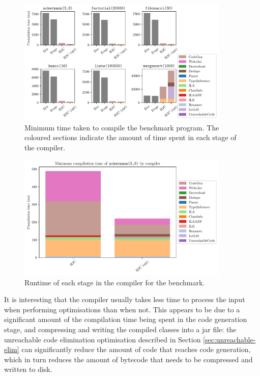 \documentclass[dissertation.tex]{subfiles}
\begin{document}
{{        \begin{figure}[h]
            \centering
            \captionsetup{width=0.8\textwidth}
            \includegraphics[width=0.9\textwidth]{graphs/compiler_perf.pdf}
            \caption{Minimum time taken to compile the benchmark program. The coloured sections indicate the amount of time spent in each stage of the compiler.}
            \label{fig:compiler-perf}
        \end{figure}
        \begin{figure}[h]
            \centering
            \captionsetup{width=0.8\textwidth}
            \includegraphics[width=0.9\textwidth]{graphs/compiler_perf_mine_ackermann.pdf}
            \caption{Runtime of each stage in the compiler for the  benchmark.}
            \label{fig:compiler-perf-ackermann}
        \end{figure}

        It is interesting that the compiler usually takes less time to process the input when performing optimisations than when not. This appears to be due to a significant amount of the compilation time being spent in the code generation stage, and compressing and writing the compiled classes into a jar file: the unreachable code elimination optimisation described in Section \ref{sec:unreachable-elim} can significantly reduce the amount of code that reaches code generation, which in turn reduces the amount of bytecode that needs to be compressed and written to disk.
    }
}
\end{document}

